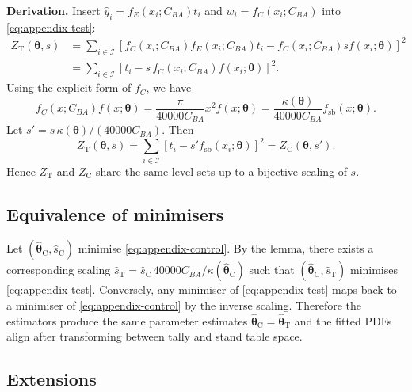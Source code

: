 \documentclass[12pt,letterpaper]{article}
\theoremstyle{plain}
\begin{document}
\noindent\textbf{Derivation.}
Insert $\hat{y}_i = f_E(x_i; C_{BA}) t_i$ and $w_i = f_C(x_i; C_{BA})$ into
\eqref{eq:appendix-test}:
\begin{align}
  Z_{\mathrm{T}}(\boldsymbol{\theta}, s)
    &= \sum_{i \in \mathcal{I}} \left[f_C(x_i; C_{BA}) f_E(x_i; C_{BA}) t_i
      - f_C(x_i; C_{BA}) s f(x_i; \boldsymbol{\theta})\right]^2 \\
    &= \sum_{i \in \mathcal{I}} \left[t_i - s \, f_C(x_i; C_{BA}) f(x_i; \boldsymbol{\theta})\right]^2.
\end{align}
Using the explicit form of $f_C$, we have
\begin{equation}
  f_C(x; C_{BA}) f(x; \boldsymbol{\theta})
  =
  \frac{\pi}{40000 C_{BA}} x^{2} f(x;\boldsymbol{\theta})
  =
  \frac{\kappa(\boldsymbol{\theta})}{40000 C_{BA}} f_{\mathrm{sb}}(x; \boldsymbol{\theta}).
\end{equation}
Let $s' = s\, \kappa(\boldsymbol{\theta})/(40000 C_{BA})$. Then
\begin{equation}
  Z_{\mathrm{T}}(\boldsymbol{\theta}, s)
  =
  \sum_{i \in \mathcal{I}} \left[t_i - s' f_{\mathrm{sb}}(x_i; \boldsymbol{\theta})\right]^2
  =
  Z_{\mathrm{C}}(\boldsymbol{\theta}, s').
\end{equation}
Hence $Z_{\mathrm{T}}$ and $Z_{\mathrm{C}}$ share the same level sets up to a
bijective scaling of $s$.

\subsection*{Equivalence of minimisers}

Let $(\hat{\boldsymbol{\theta}}_{\mathrm{C}}, \hat{s}_{\mathrm{C}})$ minimise
\eqref{eq:appendix-control}. By the lemma, there exists a corresponding scaling
$\hat{s}_{\mathrm{T}} = \hat{s}_{\mathrm{C}}\, 40000 C_{BA}/\kappa(\hat{\boldsymbol{\theta}}_{\mathrm{C}})$
such that $(\hat{\boldsymbol{\theta}}_{\mathrm{C}}, \hat{s}_{\mathrm{T}})$ minimises
\eqref{eq:appendix-test}. Conversely, any minimiser of
\eqref{eq:appendix-test} maps back to a minimiser of \eqref{eq:appendix-control}
by the inverse scaling. Therefore the estimators produce the same parameter
estimates $\hat{\boldsymbol{\theta}}_{\mathrm{C}} = \hat{\boldsymbol{\theta}}_{\mathrm{T}}$ and
the fitted PDFs align after transforming between tally and stand table space.

\subsection*{Extensions}
\end{document}
